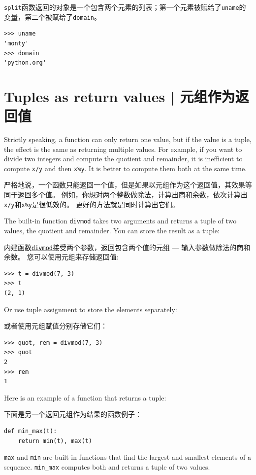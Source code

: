 \lstinline{split}函数返回的对象是一个包含两个元素的列表；第一个元素被赋给了\lstinline{uname}的变量，第二个被赋给了\lstinline{domain}。

\begin{lstlisting}
>>> uname
'monty'
>>> domain
'python.org'
\end{lstlisting}
%

\section{Tuples as return values | 元组作为返回值}
  

Strictly speaking, a function can only return one value, but
if the value is a tuple, the effect is the same as returning
multiple values.  For example, if you want to divide two integers
and compute the quotient and remainder, it is inefficient to
compute {\tt x/y} and then {\tt x\%y}.  It is better to compute
them both at the same time.

严格地说，一个函数只能返回一个值，但是如果以元组作为这个返回值，其效果等同于返回多个值。 例如，你想对两个整数做除法，计算出商和余数，依次计算出\lstinline{x/y}和\lstinline{x%y}是很低效的。 更好的方法就是同时计算出它们。

The built-in function {\tt divmod} takes two arguments and
returns a tuple of two values, the quotient and remainder.
You can store the result as a tuple:

内建函数\href{https://docs.python.org/3/library/functions.html#divmod}{\lstinline{divmod}}接受两个参数，返回包含两个值的元组 --- 输入参数做除法的商和余数。 您可以使用元组来存储返回值:

\begin{lstlisting}
>>> t = divmod(7, 3)
>>> t
(2, 1)
\end{lstlisting}
%
Or use tuple assignment to store the elements separately:

或者使用元组赋值分别存储它们：


\begin{lstlisting}
>>> quot, rem = divmod(7, 3)
>>> quot
2
>>> rem
1
\end{lstlisting}
%
Here is an example of a function that returns a tuple:

下面是另一个返回元组作为结果的函数例子：

\begin{lstlisting}
def min_max(t):
    return min(t), max(t)
\end{lstlisting}
%
{\tt max} and {\tt min} are built-in functions that find
the largest and smallest elements of a sequence.  \verb"min_max"
computes both and returns a tuple of two values.

